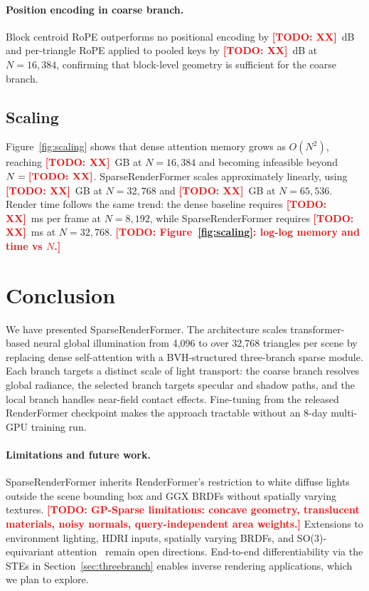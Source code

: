 \documentclass{egpubl}
\newcommand{\ours}{SparseRenderFormer\xspace}
\newcommand{\RF}{RenderFormer\xspace}
\newcommand{\todo}[1]{\textcolor{red}{\textbf{[TODO: #1]}}}
\begin{document}
\paragraph{Position encoding in coarse branch.}
Block centroid RoPE outperforms no positional encoding by \todo{XX}~dB
and per-triangle RoPE applied to pooled keys by \todo{XX}~dB at
$N = 16{,}384$, confirming that block-level geometry is sufficient for
the coarse branch.

\subsection{Scaling}
\label{sec:scaling}

Figure~\ref{fig:scaling} shows that dense attention memory grows as
$O(N^2)$, reaching \todo{XX}~GB at $N = 16{,}384$ and becoming infeasible
beyond $N = \todo{XX}$.
\ours scales approximately linearly, using \todo{XX}~GB at
$N = 32{,}768$ and \todo{XX}~GB at $N = 65{,}536$.
Render time follows the same trend: the dense baseline requires
\todo{XX}~ms per frame at $N = 8{,}192$, while \ours requires
\todo{XX}~ms at $N = 32{,}768$.
\todo{Figure~\ref{fig:scaling}: log-log memory and time vs $N$.}

\section{Conclusion}
\label{sec:conclusion}

We have presented \ours. The architecture scales transformer-based neural
global illumination from 4{,}096 to over 32{,}768 triangles per scene by
replacing dense self-attention with a BVH-structured three-branch sparse
module.
Each branch targets a distinct scale of light transport: the coarse branch
resolves global radiance, the selected branch targets specular and shadow
paths, and the local branch handles near-field contact effects.
Fine-tuning from the released \RF checkpoint makes the approach tractable
without an 8-day multi-GPU training run.

\paragraph{Limitations and future work.}
\ours inherits \RF's restriction to white diffuse lights outside the scene
bounding box and GGX BRDFs without spatially varying textures.
\todo{GP-Sparse limitations: concave geometry, translucent materials, noisy normals, query-independent area weights.}
Extensions to environment lighting, HDRI inputs, spatially varying BRDFs,
and SO(3)-equivariant attention~\cite{liao2023equiformerv2} remain open
directions.
End-to-end differentiability via the STEs in Section~\ref{sec:threebranch}
enables inverse rendering applications, which we plan to explore.



\end{document}
